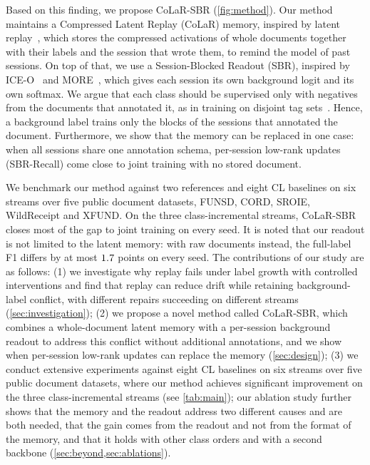 \documentclass[10pt,twocolumn,letterpaper]{article}
\begin{document}
Based on this finding, we propose CoLaR-SBR (\cref{fig:method}). Our method maintains a Compressed Latent Replay (CoLaR) memory, inspired by latent replay~\citep{hayes2020remind,pellegrini2020latent}, which stores the compressed activations of whole documents together with their labels and the session that wrote them, to remind the model of past sessions. On top of that, we use a Session-Blocked Readout (SBR), inspired by ICE-O~\citep{liu2023ice} and MORE~\citep{kim2022more}, which gives each session its own background logit and its own softmax. We argue that each class should be supervised only with negatives from the documents that annotated it, as in training on disjoint tag sets~\citep{greenberg2018marginal}. Hence, a background label trains only the blocks of the sessions that annotated the document. Furthermore, we show that the memory can be replaced in one case: when all sessions share one annotation schema, per-session low-rank updates~\citep{hu2022lora} (SBR-Recall) come close to joint training with no stored document.

We benchmark our method against two references and eight CL baselines on six streams over five public document datasets, FUNSD, CORD, SROIE, WildReceipt and XFUND. On the three class-incremental streams, CoLaR-SBR closes most of the gap to joint training on every seed. It is noted that our readout is not limited to the latent memory: with raw documents instead, the full-label F1 differs by at most $1.7$ points on every seed. The contributions of our study are as follows: (1) we investigate why replay fails under label growth with controlled interventions and find that replay can reduce drift while retaining background-label conflict, with different repairs succeeding on different streams (\cref{sec:investigation}); (2) we propose a novel method called CoLaR-SBR, which combines a whole-document latent memory with a per-session background readout to address this conflict without additional annotations, and we show when per-session low-rank updates can replace the memory (\cref{sec:design}); (3) we conduct extensive experiments against eight CL baselines on six streams over five public document datasets, where our method achieves significant improvement on the three class-incremental streams (see \cref{tab:main}); our ablation study further shows that the memory and the readout address two different causes and are both needed, that the gain comes from the readout and not from the format of the memory, and that it holds with other class orders and with a second backbone (\cref{sec:beyond,sec:ablations}).
\end{document}
